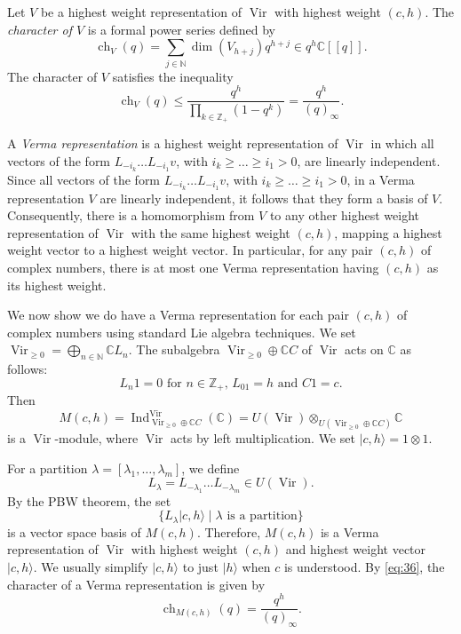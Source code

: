 \documentclass[a4paper, 12pt, reqno]{amsart}
\theoremstyle{remark}
\DeclareMathOperator{\Vir}{Vir}
\DeclareMathOperator{\ch}{ch}
\DeclareMathOperator{\Ind}{Ind}
\begin{document}
Let $V$ be a highest weight representation of $\Vir$ with highest weight $(c, h)$.
The \emph{character of $V$} is a formal power series defined by
\begin{equation*}
  \ch_V(q) = \sum_{j \in \mathbb{N}}\dim(V_{h + j})q^{h + j} \in q^h\mathbb{C}[[q]].
\end{equation*}
The character of $V$ satisfies the inequality
\begin{equation*}
  \ch_V(q) \le \frac{q^h}{\prod_{k \in \mathbb{Z}_+}(1 - q^k)} = \frac{q^h}{(q)_{\infty}}.
\end{equation*}

A \emph{Verma representation} is a highest weight representation of $\Vir$ in which all vectors of the form $L_{-i_k}\dots L_{-i_1}v$, with $i_k \ge \dots \ge i_1 > 0$, are linearly independent.
Since all vectors of the form $L_{-i_k}\dots L_{-i_1}v$, with $i_k \ge \dots \ge i_1 > 0$, in a Verma representation $V$ are linearly independent, it follows that they form a basis of $V$.
Consequently, there is a homomorphism from $V$ to any other highest weight representation of $\Vir$ with the same highest weight $(c, h)$, mapping a highest weight vector to a highest weight vector.
In particular, for any pair $(c, h)$ of complex numbers, there is at most one Verma representation having $(c, h)$ as its highest weight.

We now show we do have a Verma representation for each pair $(c, h)$ of complex numbers using standard Lie algebra techniques.
We set $\Vir_{\ge 0} = \bigoplus_{n \in \mathbb{N}}\mathbb{C}L_n$.
The subalgebra $\Vir_{\ge 0} \oplus \mathbb{C}C$ of $\Vir$ acts on $\mathbb{C}$ as follows:
\begin{equation*}
  \text{$L_n1 = 0$ for $n \in \mathbb{Z}_+$, $L_01 = h$ and $C1 = c$}.
\end{equation*}
Then
\begin{equation*}
  M(c, h) = \Ind^{\Vir}_{\Vir_{\ge 0} \oplus \mathbb{C}C}(\mathbb{C}) = U(\Vir) \otimes_{U(\Vir_{\ge 0} \oplus \mathbb{C}C)} \mathbb{C}
\end{equation*}
is a $\Vir$-module, where $\Vir$ acts by left multiplication.
We set $|c, h\rangle = 1\otimes1$.

For a partition $\lambda = [\lambda_1, \dots, \lambda_m]$, we define
\begin{equation*}
  L_{\lambda} = L_{-\lambda_1}\dots L_{-\lambda_m} \in U(\Vir).
\end{equation*}
By the PBW theorem, the set
\begin{equation*}
  \{L_{\lambda}|c, h\rangle \mid \text{$\lambda$ is a partition}\}
\end{equation*}
is a vector space basis of $M(c, h)$.
Therefore, $M(c, h)$ is a Verma representation of $\Vir$ with highest weight $(c, h)$ and highest weight vector $|c, h\rangle$.
We usually simplify $|c, h\rangle$ to just $|h\rangle$ when $c$ is understood.
By \eqref{eq:36}, the character of a Verma representation is given by
\begin{equation*}
  \ch_{M(c, h)}(q) = \frac{q^h}{(q)_{\infty}}.
\end{equation*}
\end{document}
